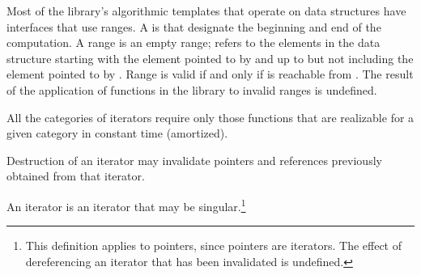 \pnum
Most of the library's algorithmic templates that operate on data structures have interfaces that use ranges.
A
is  that designate the beginning and end of the computation.
A range 
is an empty range;
refers to the elements in the data structure starting with the element
pointed to by
and up to but not including the element pointed to by
  .
Range 
is valid if and only if
is reachable from
.
The result of the application of functions in the library to invalid ranges is
undefined.

\pnum
All the categories of iterators require only those functions that are realizable for a given category in
constant time (amortized).

\pnum
Destruction of an iterator may invalidate pointers and references
previously obtained from that iterator.

\pnum
An
iterator is an iterator that may be singular.\footnote{This definition applies to pointers, since pointers are iterators.
The effect of dereferencing an iterator that has been invalidated
is undefined.
}


